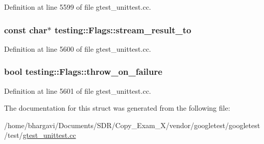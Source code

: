 Definition at line 5599 of file gtest\+\_\+unittest.\+cc.

\subsubsection[{\texorpdfstring{stream\+\_\+result\+\_\+to}{stream_result_to}}]{\setlength{\rightskip}{0pt plus 5cm}const char$\ast$ testing\+::\+Flags\+::stream\+\_\+result\+\_\+to}\hypertarget{structtesting_1_1_flags_ab09849fd3e095d5628dec65ec4dce9e1}{}\label{structtesting_1_1_flags_ab09849fd3e095d5628dec65ec4dce9e1}


Definition at line 5600 of file gtest\+\_\+unittest.\+cc.

\subsubsection[{\texorpdfstring{throw\+\_\+on\+\_\+failure}{throw_on_failure}}]{\setlength{\rightskip}{0pt plus 5cm}bool testing\+::\+Flags\+::throw\+\_\+on\+\_\+failure}\hypertarget{structtesting_1_1_flags_ab8e7d21e31e641efe47b8050759e001a}{}\label{structtesting_1_1_flags_ab8e7d21e31e641efe47b8050759e001a}


Definition at line 5601 of file gtest\+\_\+unittest.\+cc.



The documentation for this struct was generated from the following file\+:\begin{DoxyCompactItemize}
\item 
/home/bhargavi/\+Documents/\+S\+D\+R/\+Copy\+\_\+\+Exam\+\_\+X/vendor/googletest/googletest/test/\hyperlink{gtest__unittest_8cc}{gtest\+\_\+unittest.\+cc}\end{DoxyCompactItemize}
